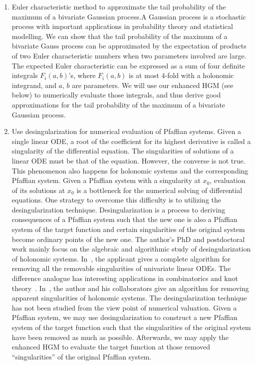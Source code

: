 \documentclass[10pt,a4paper]{article}
\begin{document}
\begin{enumerate}
\item Euler characteristic method to approximate the tail probability of the maximum of a bivariate Gaussian process.A Gaussian process is a stochastic process with important applications in probability theory and statistical modelling. We can show that the tail probability of the maximum of a bivariate Gauss process can be approximated by the expectation of products of two Euler characteristic numbers when two parameters involved are large. The expected Euler characteristic can be expressed as a sum of four definite integrals $F_i(a, b)$’s, where $F_i(a, b)$ is at most $4$-fold with a holonomic integrand, and $a$, $b$ are parameters. We will use our enhanced HGM (see below) to numerically evaluate those integrals, and thus derive good approximations for the tail probability of the maximum of a bivariate Gaussian process.

\item Use desingularization for numerical evaluation of Pfaffian systems. Given a single linear ODE, a root of the coefficient for its highest derivative is called a singularity of the differential equation. The singularities of solutions of a linear ODE must be that of the equation. However, the converse is not true. This phenomenon also happens for holonomic systems and the corresponding Pfaffian system. Given a Pfaffian system with a singularity at $x_0$, evaluation of its solutions at $x_0$ is a bottleneck for the numerical solving of differential equations. One strategy to overcome this difficulty is to utilizing the desingularization technique. Desingularization is a process to deriving consequences of a Pfaffian system such that the new one is also a Pfaffian system of the target function and certain singularities of the original system become ordinary points of the new one. The author’s PhD and postdoctoral work mainly focus on the algebraic and algorithmic study of desingularization of holonomic systems. In~\cite{Zhang2016}, the applicant gives a complete algorithm for removing all the removable singularities of univariate linear ODEs. The difference analogue has interesting applications in combinatorics and knot theory~\cite{KZ2018}. In~\cite{Yi2017}, the author and his collaborators give an algorithm for removing apparent singularities of holonomic systems. The desingularization technique has not been studied from the view point of numerical valuation. Given a Pfaffian system, we may use desingularization to construct a new Pfaffian system of the target function such that the singularities of the original system have been removed as much as possible. Afterwards, we may apply the enhanced HGM to evaluate the target function at those removed “singularities” of the original Pfaffian system.


\end{enumerate}
\end{document}
